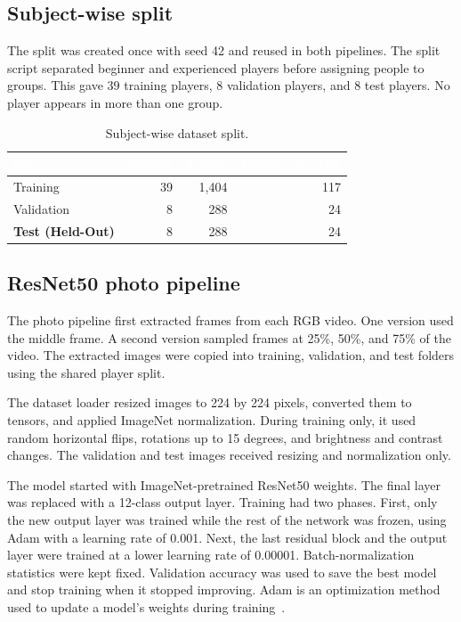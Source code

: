 \documentclass[12pt,a4paper]{article}
\begin{document}
\subsection{Subject-wise split}
The split was created once with seed 42 and reused in both pipelines. The split script separated beginner and experienced players before assigning people to groups. This gave 39 training players, 8 validation players, and 8 test players. No player appears in more than one group.

\vspace{0.6em}
\begin{table}[H]
\centering
\small
\setlength{\tabcolsep}{8pt}
\renewcommand{\arraystretch}{1.25}
\caption{Subject-wise dataset split.}
\label{tab:split}
\begin{tabular}{lrrr}
\toprule
\rowcolor{tablehead}
\textcolor{white}{\textbf{Set}} & \textcolor{white}{\textbf{Players}} & \textcolor{white}{\textbf{Videos}} & \textcolor{white}{\textbf{Videos per class}} \\
\midrule
\rowcolor{tablerowlight}
Training & 39 & 1,404 & 117 \\
Validation & 8 & 288 & 24 \\
\rowcolor{tablehighlight}
\textbf{Test (Held-Out)} & 8 & 288 & 24 \\
\bottomrule
\end{tabular}
\end{table}

\subsection{ResNet50 photo pipeline}
The photo pipeline first extracted frames from each RGB video. One version used the middle frame. A second version sampled frames at 25\%, 50\%, and 75\% of the video. The extracted images were copied into training, validation, and test folders using the shared player split.

The dataset loader resized images to 224 by 224 pixels, converted them to tensors, and applied ImageNet normalization. During training only, it used random horizontal flips, rotations up to 15 degrees, and brightness and contrast changes. The validation and test images received resizing and normalization only.

The model started with ImageNet-pretrained ResNet50 weights. The final layer was replaced with a 12-class output layer. Training had two phases. First, only the new output layer was trained while the rest of the network was frozen, using Adam with a learning rate of 0.001. Next, the last residual block and the output layer were trained at a lower learning rate of 0.00001. Batch-normalization statistics were kept fixed. Validation accuracy was used to save the best model and stop training when it stopped improving. Adam is an optimization method used to update a model's weights during training~\cite{kingma2015adam}.
\end{document}
